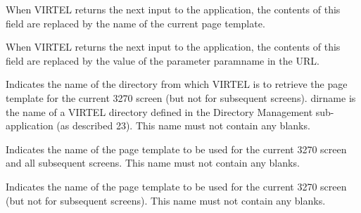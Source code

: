 \documentclass[letterpaper,10pt,english]{sphinxmanual}
\begin{document}
When VIRTEL returns the next input to the application, the contents of this field are replaced by the name of the
current page template.


\begin{sphinxVerbatim}[commandchars=\\\{\}]
   
\end{sphinxVerbatim}

When VIRTEL returns the next input to the application, the contents of this field are replaced by the value of the
parameter paramname in the URL.


\begin{sphinxVerbatim}[commandchars=\\\{\}]
  
\end{sphinxVerbatim}

Indicates the name of the directory from which VIRTEL is to retrieve the page template for the current 3270 screen
(but not for subsequent screens). dirname is the name of a VIRTEL directory defined in the Directory Management
sub-application (as described 23). This name must not contain any blanks.


\begin{sphinxVerbatim}[commandchars=\\\{\}]
   
\end{sphinxVerbatim}

Indicates the name of the page template to be used for the current 3270 screen and all subsequent screens. This name
must not contain any blanks.


\begin{sphinxVerbatim}[commandchars=\\\{\}]
  
\end{sphinxVerbatim}

Indicates the name of the page template to be used for the current 3270 screen (but not for subsequent screens). This
name must not contain any blanks.
\label{\detokenize{User_Guide:v457ug-set-variable}}
\end{document}
